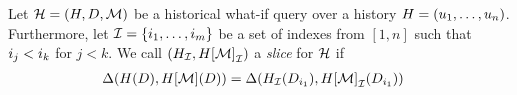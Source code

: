 \begin{defi}
  Let $\mathcal{H} = (H, D, \mathcal{M})$ be a historical what-if query over a history $H = (u_1, \ldots, u_n)$.
  Furthermore, let $\mathcal{I} = \{ i_1, \ldots, i_m \}$ be a set of indexes from $[1,n]$ such that $i_j < i_k$ for $j < k$.
  We call  $({H}_{\mathcal{I}}, {H[\mathcal{M}]}_{\mathcal{I}})$  a  \emph{slice} for $\mathcal{H}$ if
\begin{gather*}
  \begin{aligned}
    &\Delta(H(D),H[\mathcal{M}](D)) = \Delta({H}_{\mathcal{I}}(D_{i_1}),{H[\mathcal{M}]}_{\mathcal{I}}(D_{i_1}))
  \end{aligned}
\end{gather*}
\end{defi}

